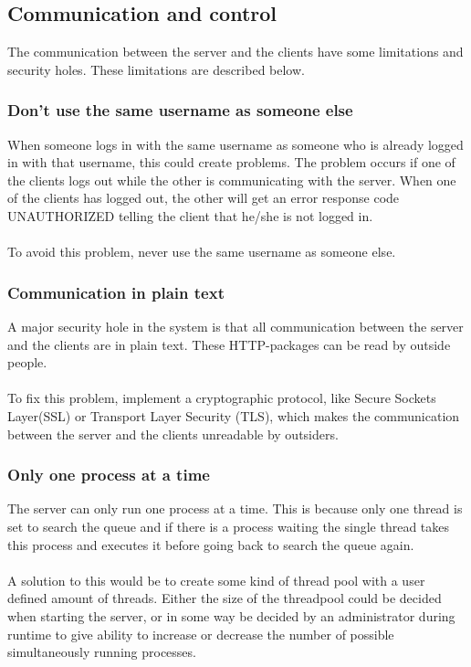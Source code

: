 \subsection{Communication and control}
The communication between the server and the clients have some limitations and security holes. These limitations are described below.

\subsubsection{Don't use the same username as someone else}
When someone logs in with the same username as someone who is already logged in with that username, this could create problems. The problem occurs if one of the clients logs out while the other is communicating with the server. When one of the clients has logged out, the other will get an error response code UNAUTHORIZED telling the client that he/she is not logged in.\\
\\
To avoid this problem, never use the same username as someone else.
\subsubsection{Communication in plain text}
A major security hole in the system is that all communication between the server and the clients are in plain text. These HTTP-packages can be read by outside people.\\
\\
To fix this problem, implement a cryptographic protocol, like Secure Sockets Layer(SSL) or Transport Layer Security (TLS), which makes the communication between the server and the clients unreadable by outsiders.

\subsubsection{Only one process at a time}
The server can only run one process at a time. This is because only one thread is set to search the queue and if there is a process waiting the single thread takes this process and executes it before going back to search the queue again.\\
\\
A solution to this would be to create some kind of thread pool with a user defined amount of threads. Either the size of the threadpool could be decided when starting the server, or in some way be decided by an administrator during runtime to give ability to increase or decrease the number of possible simultaneously running processes.
